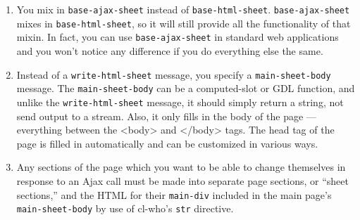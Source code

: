 \documentclass [11pt]{book}
\begin{document}
\begin{enumerate}

\item You mix in \texttt{base-ajax-sheet} instead of \texttt{base-html-sheet}. \texttt{base-ajax-sheet} mixes in \texttt{base-html-sheet}, so it will still provide all the functionality of that
   mixin. In fact, you can use \texttt{base-ajax-sheet} in standard web applications and you won't notice any difference if you do
    everything else the same.

\item Instead of a \texttt{write-html-sheet} message, you specify a \texttt{main-sheet-body} message. The \texttt{main-sheet-body}  can be a computed-slot or GDL function,
    and unlike the \texttt{write-html-sheet} message, it should
    simply return a string, not send output to a stream. Also, it only
    fills in the body of the page --- everything between the <body>
    and </body> tags. The head tag of the page is filled in
    automatically and can be customized in various ways.

\item Any sections of the page which you want to be able
      to change themselves in response to an Ajax call must be made
      into separate page sections, or ``sheet sections,'' and the HTML
      for their \texttt{main-div} included in the main page's \texttt{main-sheet-body} by use of cl-who's \texttt{str} directive.

\end{enumerate}
\end{document}
